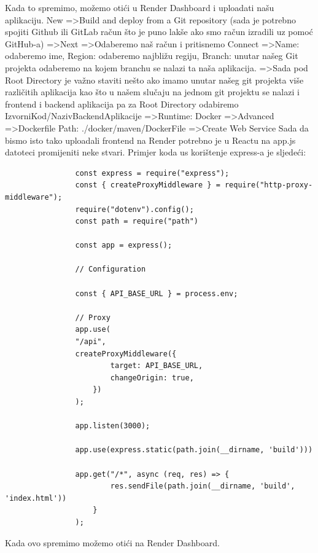 			\noindent Kada to spremimo, možemo otići u Render Dashboard i uploadati našu aplikaciju.
			New =\textgreater  Build and deploy from a Git repository (sada je potrebno spojiti Github ili GitLab račun što je puno lakše ako smo račun izradili uz pomoć GitHub-a) =\textgreater  Next =\textgreater  Odaberemo naš račun i pritisnemo Connect =\textgreater  Name: odaberemo ime, Region: odaberemo najbližu regiju, Branch: unutar našeg Git projekta odaberemo na kojem branchu se nalazi ta naša aplikacija.
			=\textgreater  Sada pod Root Directory je važno staviti nešto ako imamo unutar našeg git projekta više različitih aplikacija kao što u našem slučaju na jednom git projektu se nalazi i frontend i backend aplikacija pa za Root Directory odabiremo IzvorniKod/NazivBackendAplikacije =\textgreater  Runtime: Docker =\textgreater  Advanced =\textgreater  Dockerfile Path: ./docker/maven/DockerFile =\textgreater  Create Web Service 
			\bigbreak
			\noindent Sada da bismo isto tako uploadali frontend na Render potrebno je u Reactu na app.js datoteci promijeniti neke stvari. Primjer koda us korištenje express-a je sljedeći:
			\bigbreak
			\begin{verbatim}
				const express = require("express");
				const { createProxyMiddleware } = require("http-proxy-middleware");
				require("dotenv").config();
				const path = require("path")
				
				const app = express();
				
				// Configuration
				
				const { API_BASE_URL } = process.env;
				
				// Proxy
				app.use(
				"/api",
				createProxyMiddleware({
						target: API_BASE_URL,
						changeOrigin: true,
					})
				);
				
				app.listen(3000);
				
				app.use(express.static(path.join(__dirname, 'build')))
				
				app.get("/*", async (req, res) => {
						res.sendFile(path.join(__dirname, 'build', 'index.html'))
					}
				);
			\end{verbatim}
			\bigbreak
			\noindent Kada ovo spremimo možemo otići na Render Dashboard.\newline
			
